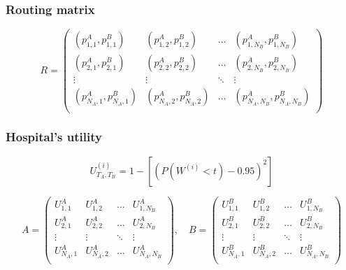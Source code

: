 \begin{frame}
    \frametitle{Routing matrix}
    \small
    \begin{equation*}
        R =
        \begin{pmatrix}
            (p_{1,1}^A, p_{1,1}^B) & (p_{1,2}^A, p_{1,2}^B) & \dots &
            (p_{1,N_B}^A, p_{1,N_B}^B) \\
            (p_{2,1}^A, p_{2,1}^B) & (p_{2,2}^A, p_{2,2}^B) & \dots &
            (p_{2,N_B}^A, p_{2,N_B}^B) \\
            \vdots & \vdots & \ddots & \vdots \\
            (p_{N_A,1}^A, p_{N_A,1}^B) & (p_{N_A,2}^A, p_{N_A,2}^B) & \dots &
            (p_{N_A,N_B}^A, p_{N_A,N_B}^B) \\
        \end{pmatrix}    
    \end{equation*}
\end{frame}


\begin{frame}
    \frametitle{Hospital's utility}

    \begin{equation*}
        U_{T_A,T_B}^{(i)} = 1 - \left[ (P(W^{(i)} < t) - 0.95)^2 \right]
    \end{equation*}

    \scriptsize
    \begin{equation*}
        A = 
        \begin{pmatrix}
            U_{1,1}^A & U_{1,2}^A & \dots & U_{1,N_B}^A \\ 
            U_{2,1}^A & U_{2,2}^A & \dots & U_{2,N_B}^A \\
            \vdots & \vdots & \ddots & \vdots \\
            U_{N_A,1}^A & U_{N_A,2}^A & \dots & U_{N_A,N_B}^A \\
        \end{pmatrix}, \quad
        B = 
        \begin{pmatrix}
            U_{1,1}^B & U_{1,2}^B & \dots & U_{1,N_B}^B \\ 
            U_{2,1}^B & U_{2,2}^B & \dots & U_{2,N_B}^B \\
            \vdots & \vdots & \ddots & \vdots \\
            U_{N_A,1}^B & U_{N_A,2}^B & \dots & U_{N_A,N_B}^B \\
        \end{pmatrix}
    \end{equation*}

\end{frame}


